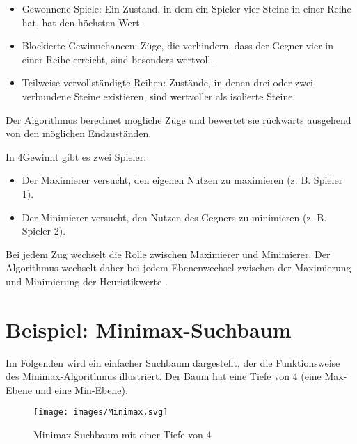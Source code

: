 \begin{itemize}
	\item Gewonnene Spiele: Ein Zustand, in dem ein Spieler vier Steine in einer Reihe hat, hat den höchsten Wert.
	\item Blockierte Gewinnchancen: Züge, die verhindern, dass der Gegner vier in einer Reihe erreicht, sind besonders wertvoll.
	\item Teilweise vervollständigte Reihen: Zustände, in denen drei oder zwei verbundene Steine existieren, sind wertvoller als isolierte Steine.
\end{itemize}

Der Algorithmus berechnet mögliche Züge und bewertet sie rückwärts ausgehend von den möglichen Endzuständen.

In 4Gewinnt gibt es zwei Spieler:

\begin{itemize}
	\item Der Maximierer versucht, den eigenen Nutzen zu maximieren (z. B. Spieler 1).
	\item Der Minimierer versucht, den Nutzen des Gegners zu minimieren (z. B. Spieler 2).
\end{itemize}

Bei jedem Zug wechselt die Rolle zwischen Maximierer und Minimierer. Der Algorithmus wechselt daher bei jedem Ebenenwechsel zwischen der Maximierung und Minimierung der Heuristikwerte \autocites{krusenotto_anwendungsbeispiel_2016}.

\section*{Beispiel: Minimax-Suchbaum}

Im Folgenden wird ein einfacher Suchbaum dargestellt, der die Funktionsweise des Minimax-Algorithmus illustriert. Der Baum hat eine Tiefe von 4 (eine Max-Ebene und eine Min-Ebene).

\begin{figure}[H]
	\centering
	\texttt{[image: images/Minimax.svg]}
	\caption[Minimax-Suchbaum: ]{Minimax-Suchbaum mit einer Tiefe von 4 \autocite{Wikipedia:Minimax}}
	\label{fig:minimax}
\end{figure}



